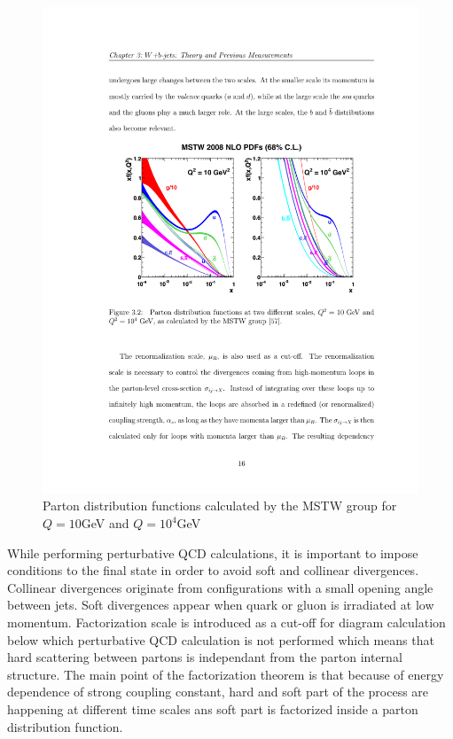\begin{figure}[htbp]
	\centering
		\includegraphics{Figures/MSTW.pdf}
	\caption[Parton distribution functions for different momentum transfers]{Parton distribution functions calculated by the MSTW group for $Q=10$GeV and $Q=10^4$GeV \citep{Martin:2009iq}}
	\label{fig:MSTW}
\end{figure}

While performing perturbative QCD calculations, it is important to impose conditions to the final state in order to avoid soft and collinear divergences. Collinear divergences originate from configurations with a small opening angle between jets. Soft divergences appear when quark or gluon is irradiated at low momentum. Factorization scale is introduced as a cut-off for diagram calculation below which perturbative QCD calculation is not performed which means that hard scattering between partons is independant from the parton internal structure. The main point of the factorization theorem  is that because of energy dependence of strong coupling constant, hard and soft part of the process are happening at different time scales ans soft part is factorized inside a parton distribution function.


